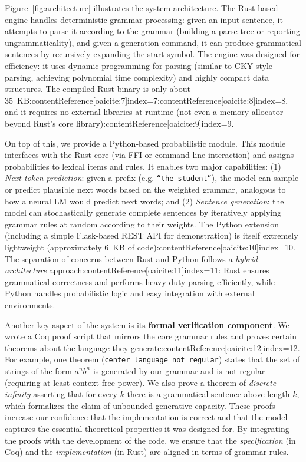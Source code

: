 \documentclass[11pt]{article}
\begin{document}
Figure~\ref{fig:architecture} illustrates the system architecture. The Rust-based engine handles deterministic grammar processing: given an input sentence, it attempts to parse it according to the grammar (building a parse tree or reporting ungrammaticality), and given a generation command, it can produce grammatical sentences by recursively expanding the start symbol. The engine was designed for efficiency: it uses dynamic programming for parsing (similar to CKY-style parsing, achieving polynomial time complexity) and highly compact data structures. The compiled Rust binary is only about 35~KB:contentReference[oaicite:7]{index=7}:contentReference[oaicite:8]{index=8}, and it requires no external libraries at runtime (not even a memory allocator beyond Rust's core library):contentReference[oaicite:9]{index=9}.

On top of this, we provide a Python-based probabilistic module. This module interfaces with the Rust core (via FFI or command-line interaction) and assigns probabilities to lexical items and rules. It enables two major capabilities: (1) \emph{Next-token prediction}: given a prefix (e.g. \texttt{\textquotedblleft the student\textquotedblright}), the model can sample or predict plausible next words based on the weighted grammar, analogous to how a neural LM would predict next words; and (2) \emph{Sentence generation}: the model can stochastically generate complete sentences by iteratively applying grammar rules at random according to their weights. The Python extension (including a simple Flask-based REST API for demonstration) is itself extremely lightweight (approximately 6~KB of code):contentReference[oaicite:10]{index=10}. The separation of concerns between Rust and Python follows a \emph{hybrid architecture} approach:contentReference[oaicite:11]{index=11}: Rust ensures grammatical correctness and performs heavy-duty parsing efficiently, while Python handles probabilistic logic and easy integration with external environments.

Another key aspect of the system is its \textbf{formal verification component}. We wrote a Coq proof script that mirrors the core grammar rules and proves certain theorems about the language they generate:contentReference[oaicite:12]{index=12}. For example, one theorem (\texttt{center\_language\_not\_regular}) states that the set of strings of the form $a^n b^n$ is generated by our grammar and is not regular (requiring at least context-free power). We also prove a theorem of \emph{discrete infinity} asserting that for every $k$ there is a grammatical sentence above length $k$, which formalizes the claim of unbounded generative capacity. These proofs increase our confidence that the implementation is correct and that the model captures the essential theoretical properties it was designed for. By integrating the proofs with the development of the code, we ensure that the \textit{specification} (in Coq) and the \textit{implementation} (in Rust) are aligned in terms of grammar rules.
\end{document}

